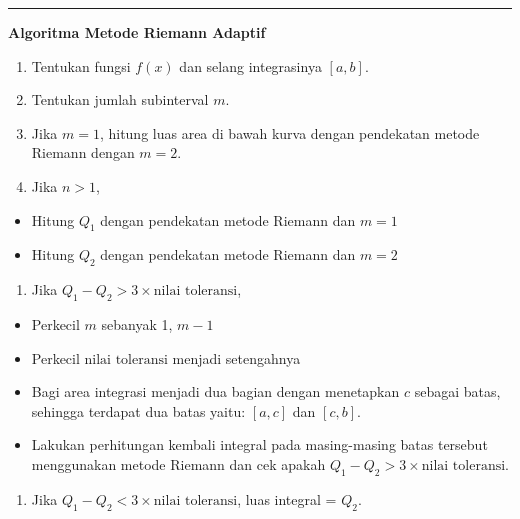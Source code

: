 \documentclass[
]{book}
\providecommand{\tightlist}{%
  \setlength{\itemsep}{0pt}\setlength{\parskip}{0pt}}
\theoremstyle{definition}
\theoremstyle{definition}
\theoremstyle{definition}
\theoremstyle{definition}
\theoremstyle{remark}
\begin{document}
\begin{center}\rule{0.5\linewidth}{0.5pt}\end{center}

\textbf{Algoritma Metode Riemann Adaptif}

\begin{enumerate}
\def\labelenumi{\arabic{enumi}.}
\tightlist
\item
  Tentukan fungsi \(f\left(x\right)\) dan selang integrasinya \(\left[a,b\right]\).
\item
  Tentukan jumlah subinterval \(m\).
\item
  Jika \(m=1\), hitung luas area di bawah kurva dengan pendekatan metode Riemann dengan \(m=2\).
\item
  Jika \(n>1\),
\end{enumerate}

\begin{itemize}
\tightlist
\item
  Hitung \(Q_1\) dengan pendekatan metode Riemann dan \(m=1\)
\item
  Hitung \(Q_2\) dengan pendekatan metode Riemann dan \(m=2\)
\end{itemize}

\begin{enumerate}
\def\labelenumi{\arabic{enumi}.}
\setcounter{enumi}{4}
\tightlist
\item
  Jika \(Q_1-Q_2>3\times\text{nilai toleransi}\),
\end{enumerate}

\begin{itemize}
\tightlist
\item
  Perkecil \(m\) sebanyak 1, \(m-1\)
\item
  Perkecil \(\text{nilai toleransi}\) menjadi setengahnya
\item
  Bagi area integrasi menjadi dua bagian dengan menetapkan \(c\) sebagai batas, sehingga terdapat dua batas yaitu: \(\left[a, c\right]\) dan \(\left[c, b\right]\).
\item
  Lakukan perhitungan kembali integral pada masing-masing batas tersebut menggunakan metode Riemann dan cek apakah \(Q_1-Q_2>3\times\text{nilai toleransi}\).
\end{itemize}

\begin{enumerate}
\def\labelenumi{\arabic{enumi}.}
\setcounter{enumi}{5}
\tightlist
\item
  Jika \(Q_1-Q_2<3\times\text{nilai toleransi}\), luas integral = \(Q_2\).
\end{enumerate}
\end{document}

